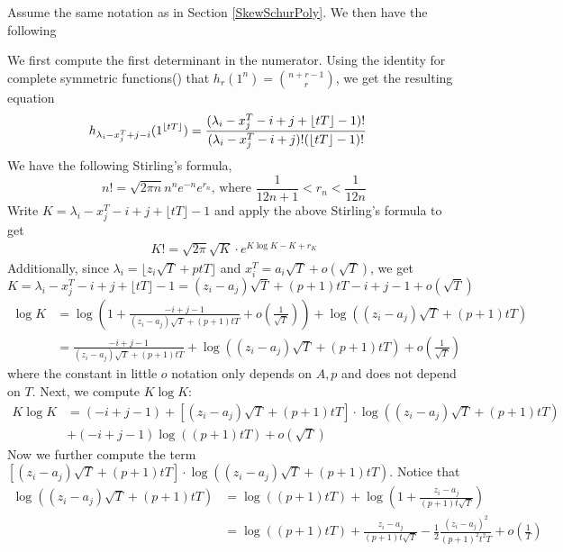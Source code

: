 \begin{lemma}
	Assume the same notation as in Section \ref{SkewSchurPoly}. We then have the following 
\end{lemma}
We first compute the first determinant in the numerator. Using the identity for complete symmetric functions(\cite[Example 1, Section I.2]{Mac}) that $h_r(1^n)=\binom{n+r-1}{r}$, we get the resulting equation 
\begin{align}{\label{h}}
h_{\lambda_i-x_j^T+j-i}(1^{\lfloor tT\rfloor})&=\frac{(\lambda_{i}-x_{j}^{T}-i+j+\lfloor tT \rfloor -1)!}{(\lambda_{i}-x_{j}^{T}-i+j)!(\lfloor tT \rfloor -1)!}
\end{align}
We have the following Stirling's formula, 
$$n!=\sqrt{2\pi n}n^ne^{-n}e^{r_{n}}\text{, where }\frac{1}{12n+1}<r_{n}<\frac{1}{12n}$$
Write $K=\lambda_{i}-x_{j}^{T}-i+j+\lfloor tT \rfloor -1$ and apply the above Stirling's formula to get
\begin{align*}
K!=\sqrt{2\pi}\sqrt{K}\cdot e^{K\log K-K+r_{K}}
\end{align*}
Additionally, since $\lambda_{i}=\lfloor z_{i}\sqrt{T}+ptT\rfloor$ and $x_{i}^{T}= a_{i}\sqrt{T}+o(\sqrt{T})$, we get \[K=\lambda_{i}-x_{j}^{T}-i+j+\lfloor tT \rfloor -1= (z_{i}-a_{j})\sqrt{T} + (p+1)tT-i+j-1+o(\sqrt{T})\]
\begin{align*}
	\log K&=\log\left(1+\frac{-i+j-1}{(z_{i}-a_{j})\sqrt{T}+(p+1)tT}+o(\frac{1}{\sqrt{T}})\right)+\log((z_{i}-a_{j})\sqrt{T}+(p+1)tT)\\
	&=\frac{-i+j-1}{(z_{i}-a_{j})\sqrt{T}+(p+1)tT}+\log((z_{i}-a_{j})\sqrt{T}+(p+1)tT)+o(\frac{1}{\sqrt{T}})
\end{align*}
where the constant in little $o$ notation only depends on $A,p$ and does not depend on $T$.
Next, we compute $K\log K$:
\begin{align*}
K\log K &=\left(-i+j-1\right) + \left[(z_{i}-a_{j})\sqrt{T}+(p+1)tT\right]\cdot \log\left((z_{i}-a_{j})\sqrt{T}+(p+1)tT\right)\\&+(-i+j-1)\log\left((p+1)tT\right)+o(\sqrt{T})
\end{align*}
Now we further compute the term $\left[(z_{i}-a_{j})\sqrt{T}+(p+1)tT\right]\cdot \log\left((z_{i}-a_{j})\sqrt{T}+(p+1)tT\right)$. Notice that
\begin{align*}
	\log\left((z_{i}-a_{j})\sqrt{T}+(p+1)tT\right)&= \log\left((p+1)tT\right)+\log\left(1+\frac{z_{i}-a_{j}}{(p+1)t\sqrt{T}}\right)\\
	&= \log((p+1)tT)+\frac{z_{i}-a_{j}}{(p+1)t\sqrt{T}}-\frac{1}{2}\frac{(z_{i}-a_{j})^2}{(p+1)^{2}t^{2}T}+o(\frac{1}{T})
\end{align*}
